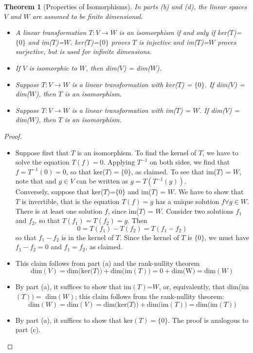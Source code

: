 \documentclass[10pt]{report}
\newtheorem{thm2}{Theorem}[section]
\begin{document}
\begin{thm2}[Properties of Isomorphisms]
In parts (b) and (d), the linear spaces $V$ and $W$ are assumed to be finite dimensional.
\begin{itemize}
\item[a.] A linear transformation $T:V\to W$ is an isomorphism if and only if ker($T$)=$\{0\}$ and im($T$)=$W$. ker($T$)=$\{0\}$ proves $T$ is injective and im($T$)=$W$ proves surjective, but is used for infinite dimensions.
\item[b.] If $V$ is isomorphic to $W$, then dim($V$) = dim($W$).
\item[c.] Suppose $T:V\to W$ is a linear transformation with ker($T$) = $\{0\}$. If dim($V$) = dim($W$), then $T$ is an isomorphism.
\item[d.] Suppose $T:V\to W$ is a linear transformation with im($T$) = $W$. If dim($V$) = dim($W$), then $T$ is an isomorphism.
\end{itemize}
\end{thm2}
\begin{proof}
\begin{itemize}
\item[a.] Suppose first that $T$ is an isomorphism. To find the kernel of $T$, we have to solve the equation $T(f)=0$. Applying $T^{-1}$ on both sides, we find that $f=T^{-1}(0)=0$, so that ker($T)=\{0\}$, as claimed. To see that im($T$) = $W$, note that and $g\in V$ can be written as $g = T(T^{-1}(g))$.\\
Conversely, suppose that ker($T$)=$\{0\}$ and im($T$) = $W$. We have to show that $T$ is invertible, that is the equation $T(f)=g$ has a unique solution $f\forall g\in W$. There is at least one solution $f$, since im($T$) = $W$. Consider two solutions $f_1$ and $f_2$, so that $T(f_1)=T(f_2)=g$. Then
$$0=T(f_1)-T(f_2)=T(f_1-f_2)$$
so that $f_1-f_2$ is in the kernel of $T$. Since the kernel of $T$ is $\{0\}$, we must have $f_1-f_2=0$ and $f_1=f_2$, as claimed.
\item[b.] This claim follows from part (a) and the rank-nullity theorem
$$\text{dim}(V)=\text{dim(ker(}T))+ \text{dim(im}(T))=0 + \text{dim(W)} = \text{dim}(W)$$
\item[c.] By part (a), it suffices to show that im$(T)$=$W$, or, equivalently, that dim(im$(T))=$ dim$(W)$; this claim follows from the rank-nullity theorem:
$$\text{dim}(W) = \text{dim}(V)= \text{dim(ker(}T))+ \text{dim(im}(T)) = \text{dim(im}(T))$$
\item[d.] By part (a), it suffices to show that ker$(T)=\{0\}$. The proof is analogous to part (c).
\end{itemize}
\end{proof}
\end{document}
